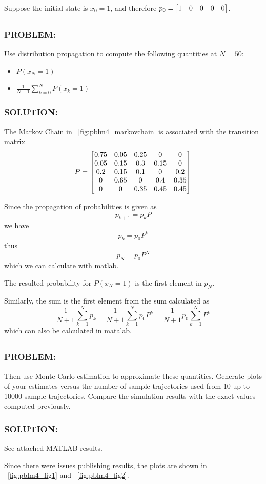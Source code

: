 \documentclass[]{article}
\newcommand{\Problem}{\subsubsection*{\textbf{PROBLEM:}}}
\newcommand{\Solution}{\subsubsection*{\textbf{SOLUTION:}}}
\begin{document}
Suppose the initial state is $x_0 = 1$, and therefore $p_0 = \mqty[1&0&0&0&0]$.

\subsection{}
\Problem
Use distribution propagation to compute the following quantities at $N = 50$:
\begin{itemize}
    \item $P(x_N = 1)$
    \item $\frac{1}{N+1} \sum_{k=0}^N P(x_k = 1)$
\end{itemize}

\Solution
The Markov Chain in \figurename \ \ref{fig:pblm4_markovchain} is associated with the transition matrix \[
    P = \mqty[
        0.75    &0.05   &0.25   &0      &0\\
        0.05    &0.15   &0.3    &0.15   &0\\
        0.2     &0.15   &0.1    &0      &0.2\\
        0       &0.65   &0      &0.4    &0.35\\
        0       &0      &0.35   &0.45   &0.45
    ]
\]

Since the propagation of probabilities is given as \[
    p_{k+1} = p_{k} P
\] we have \[
    p_{k} = p_0 P^{k}
\] thus \[
    p_{N} = p_0 P^{N} 
\] which we can calculate with matlab.

The resulted probability for $P(x_N = 1)$ is the first element in $p_{N}$.

Similarly, the sum is the first element from the sum calculated as \[
    \frac{1}{N+1} \sum_{k=1}^N p_k
    = \frac{1}{N+1} \sum_{k=1}^N p_0 P^{k}
    = \frac{1}{N+1} p_0 \sum_{k=1}^N P^{k}
\] which can also be calculated in matalab.

\subsection{}
\Problem
Then use Monte Carlo estimation to approximate these quantities.
Generate plots of your estimates versus the number of sample trajectories used from 10 up to 10000 sample trajectories.
Compare the simulation results with the exact values computed previously.
\Solution

See attached MATLAB results.

Since there were issues publishing results, the plots are shown in \figurename \ \ref{fig:pblm4_fig1} and \figurename \ \ref{fig:pblm4_fig2}.
\end{document}
